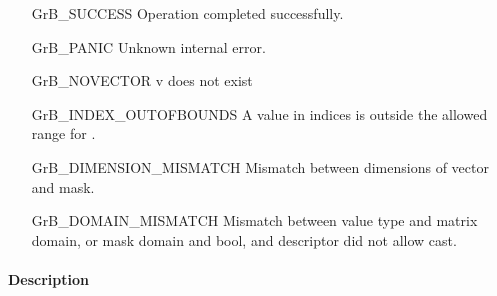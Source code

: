 \begin{itemize}[leftmargin=2.1in]
    \item[{\sf GrB\_SUCCESS}]     Operation completed successfully.
    \item[{\sf GrB\_PANIC}]            Unknown internal error.
    \item[{\sf GrB\_NOVECTOR}]      {\sf v} does not exist
    \item[{\sf GrB\_INDEX\_OUTOFBOUNDS}]
                       A value in {\sf indices} is outside the allowed range for .
    \item[\sf GrB\_DIMENSION\_MISMATCH]  
                       Mismatch between dimensions of vector and mask. 
    \item[\sf GrB\_DOMAIN\_MISMATCH]  
                       Mismatch between value type and matrix domain, or mask domain and {\sf bool}, and descriptor did not allow cast.
\end{itemize}


\paragraph{Description}
